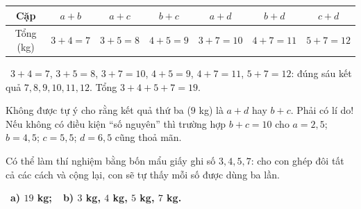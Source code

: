 \documentclass[11pt]{article}
\providecommand{\AnsWord}{Đáp số}
\newcommand{\ans}[1]{\par\smallskip{\bfseries\color{tmGreen!88!black}\AnsWord:}\ {\bfseries\color{AnsRed}#1}\par}
\newcommand{\verify}[1]{\par\smallskip\noindent{\bfseries\color{tmGreen!80!black}\faCheckCircle\ \CheckWord}\ #1\par}
\def\AnsWord{Đáp số}
\def\CheckWord{Thử lại:}
\begin{document}
{\begin{center}
\begin{tabular}{|c|c|c|c|c|c|c|}
\hline
\rowcolor{tmBlue!10} Cặp & $a+b$ & $a+c$ & $b+c$ & $a+d$ & $b+d$ & $c+d$\\ \hline
Tổng (kg) & $3+4=7$ & $3+5=8$ & $4+5=9$ & $3+7=10$ & $4+7=11$ & $5+7=12$\\ \hline
\end{tabular}
\end{center}
\verify{$3+4=7$, $3+5=8$, $3+7=10$, $4+5=9$, $4+7=11$, $5+7=12$: đúng sáu kết quả $7,8,9,10,11,12$. Tổng $3+4+5+7=19$.}
\begin{warnbox}Không được tự ý cho rằng kết quả thứ ba ($9$ kg) là $a+d$ hay $b+c$. Phải có lí do! Nếu không có điều kiện ``số nguyên'' thì trường hợp $b+c=10$ cho $a=2{,}5$; $b=4{,}5$; $c=5{,}5$; $d=6{,}5$ cũng thoả mãn.\end{warnbox}
\begin{parentbox}Có thể làm thí nghiệm bằng bốn mẩu giấy ghi số $3,4,5,7$: cho con ghép đôi tất cả các cách và cộng lại, con sẽ tự thấy mỗi số được dùng ba lần.\end{parentbox}
\ans{a) $19$ kg;\ \ b) $3$ kg, $4$ kg, $5$ kg, $7$ kg.}
}

\providecommand{\rvabShp}[3]{%
  \if#1T\draw[tmBlue!80!black,line width=0.8pt,fill=tmBlue!18] (#2,#3)--(#2+0.34,#3)--(#2+0.17,#3+0.3)--cycle;\fi
  \if#1C\draw[tmOrange!85!black,line width=0.8pt,fill=tmOrange!22] (#2+0.15,#3+0.15) circle (0.15);\fi
  \if#1S\draw[tmGreen!80!black,line width=0.8pt,fill=tmGreen!18] (#2,#3) rectangle (#2+0.3,#3+0.3);\fi
  \if#1D\draw[tmPurple!85!black,line width=0.8pt,fill=tmPurple!18] (#2+0.13,#3)--(#2+0.26,#3+0.16)--(#2+0.13,#3+0.32)--(#2,#3+0.16)--cycle;\fi
  \if#1Q\node[font=\Large\bfseries,text=Ink,inner sep=0pt,anchor=south] at (#2+0.15,#3) {?};\fi}
\providecommand{\rvabTri}{\tikz[baseline=0pt]{\rvabShp{T}{0}{0}}}
\providecommand{\rvabCir}{\tikz[baseline=0pt]{\rvabShp{C}{0}{0}}}
\providecommand{\rvabSq}{\tikz[baseline=0pt]{\rvabShp{S}{0}{0}}}
\providecommand{\rvabDia}{\tikz[baseline=0pt]{\rvabShp{D}{0}{0}}}
\providecommand{\rvabRow}[3]{%
  \foreach \rvabS [count=\rvabI] in {#1}{\xdef\rvabN{\rvabI}}%
  \foreach \rvabS [count=\rvabI] in {#1}{\rvabShp{\rvabS}{#2-0.19*\rvabN+0.38*\rvabI-0.36}{#3+0.03}}}
\providecommand{\rvabScale}[4]{\begin{scope}[shift={(#1,#2)}]
  \draw[Ink,line width=1pt] (-1.9,0.55)--(-0.5,0.55) (-1.2,0.55)--(-1.2,0.25)--(1.2,0.25)--(1.2,0.55) (0.5,0.55)--(1.9,0.55);
  \draw[Ink,line width=0.9pt,fill=Ink!12] (-0.2,-0.12)--(0,0.25)--(0.2,-0.12)--cycle;
  \rvabRow{#3}{-1.2}{0.55}\rvabRow{#4}{1.2}{0.55}
\end{scope}}
\end{document}
